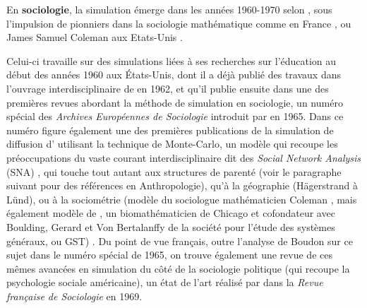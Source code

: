 
En \textbf{sociologie}, la simulation émerge dans les années 1960-1970 selon \textcites[50]{Manzo2005}[16]{Manzo2007}, sous l'impulsion de pionniers dans la sociologie mathématique comme \textcites{Boudon1967, Gremy1971} en France  , ou James Samuel Coleman aux Etats-Unis . 

Celui-ci travaille sur des simulations liées à ses recherches sur l'éducation au début des années 1960 aux États-Unis, dont il a déjà publié des travaux dans l'ouvrage interdisciplinaire de \textcite{Guetzkow1962} en 1962, et qu'il publie ensuite \autocite{Coleman1965} dans une des premières revues abordant la méthode de simulation en sociologie, un numéro spécial des \textit{Archives Européennes de Sociologie} introduit par \textcite{Boudon1965} en 1965. Dans ce  numéro figure également une des premières publications de la simulation de diffusion d'\textcite{Hagerstrand1965} utilisant la technique de Monte-Carlo, un modèle qui recoupe les préoccupations du vaste courant interdisciplinaire dit des \textit{Social Network Analysis} (SNA) \autocite{Bernard2005}, qui touche tout autant aux structures de parenté (voir le paragraphe suivant pour des références en Anthropologie), qu'à la géographie (Hägerstrand à Lünd), ou à la sociométrie (modèle du sociologue mathématicien Coleman \textcite{Coleman1957}, mais également modèle de \textcite{Rapoport1961}, un biomathématicien de Chicago et cofondateur avec Boulding, Gerard et Von Bertalanffy de la société pour l'étude des systèmes généraux, ou GST) . Du point de vue français, outre l'analyse de Boudon sur ce sujet dans le numéro spécial de 1965, on trouve également une revue de ces mêmes avancées en simulation du côté de la sociologie politique (qui recoupe la psychologie sociale américaine), un état de l'art réalisé par \textcite{Padioleau1969} dans la \textit{Revue française de Sociologie} en 1969.

